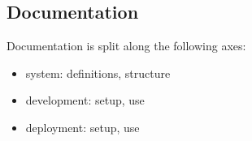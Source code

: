 \documentclass[11pt]{article}
\begin{document}
\subsection{Documentation}
\label{sec:orgc6b6f12}
Documentation is split along the following axes:
\begin{itemize}
\item system: definitions, structure
\item development: setup, use
\item deployment: setup, use
\end{itemize}
\end{document}
